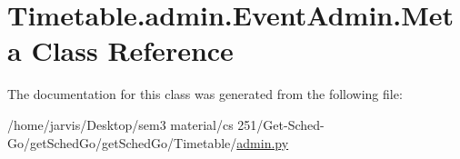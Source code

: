 \hypertarget{classTimetable_1_1admin_1_1EventAdmin_1_1Meta}{}\section{Timetable.\+admin.\+Event\+Admin.\+Meta Class Reference}
\label{classTimetable_1_1admin_1_1EventAdmin_1_1Meta}


The documentation for this class was generated from the following file\+:\begin{DoxyCompactItemize}
\item 
/home/jarvis/\+Desktop/sem3 material/cs 251/\+Get-\/\+Sched-\/\+Go/get\+Sched\+Go/get\+Sched\+Go/\+Timetable/\hyperlink{Timetable_2admin_8py}{admin.\+py}\end{DoxyCompactItemize}
